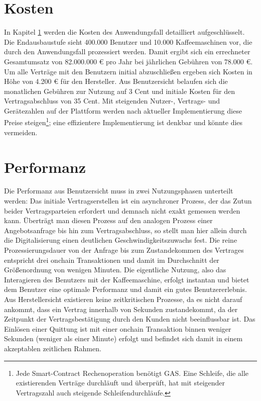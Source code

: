 \section{Kosten}
\label{sec:results:costs}
In Kapitel \ref{sec:results:costs} werden die Kosten des Anwendungsfall detailliert aufgeschlüsselt. Die Endausbaustufe sieht 400.000 Benutzer und 10.000 Kaffeemaschinen vor, die durch den Anwendungsfall prozessiert werden. Damit ergibt sich ein errechneter Gesamtumsatz von 82.000.000 € pro Jahr bei jährlichen Gebühren von 78.000 €. Um alle Verträge mit den Benutzern initial abzuschließen ergeben sich Kosten in Höhe von 4.200 € für den Hersteller. Aus Benutzersicht belaufen sich die monatlichen Gebühren zur Nutzung auf 3 Cent und initiale Kosten für den Vertragsabschluss von 35 Cent. Mit steigenden Nutzer-, Vertrags- und Gerätezahlen auf der Plattform werden nach aktueller Implementierung diese Preise steigen\footnote{Jede Smart-Contract Rechenoperation benötigt GAS. Eine Schleife, die alle existierenden Verträge durchläuft und überprüft, hat mit steigender Vertragszahl auch steigende Schleifendurchläufe.}; eine effizientere Implementierung ist denkbar und könnte dies vermeiden.

\section{Performanz}
\label{sec:results:performance}
Die Performanz aus Benutzersicht muss in zwei Nutzungsphasen unterteilt werden: Das initiale Vertragserstellen ist ein asynchroner Prozess, der das Zutun beider Vertragsparteien erfordert und demnach nicht exakt gemessen werden kann. Überträgt man diesen Prozess auf den analogen Prozess einer Angebotsanfrage bis hin zum Vertragsabschluss, so stellt man hier allein durch die Digitalisierung einen deutlichen Geschwindigkeitszuwachs fest. Die reine Prozessierungsdauer von der Anfrage bis zum Zustandekommen des Vertrages entspricht drei onchain Transaktionen und damit im Durchschnitt der Größenordnung von wenigen Minuten. Die eigentliche Nutzung, also das Interagieren des Benutzers mit der Kaffeemaschine, erfolgt instantan und bietet dem Benutzer eine optimale Performanz und damit ein gutes Benutzererlebnis.\\
Aus Herstellersicht existieren keine zeitkritischen Prozesse, da es nicht darauf ankommt, dass ein Vertrag innerhalb von Sekunden zustandekommt, da der Zeitpunkt der Vertragsbestätigung durch den Kunden nicht beeinflussbar ist. Das Einlösen einer Quittung ist mit einer onchain Transaktion binnen weniger Sekunden (weniger als einer Minute) erfolgt und befindet sich damit in einem akzeptablen zeitlichen Rahmen.

